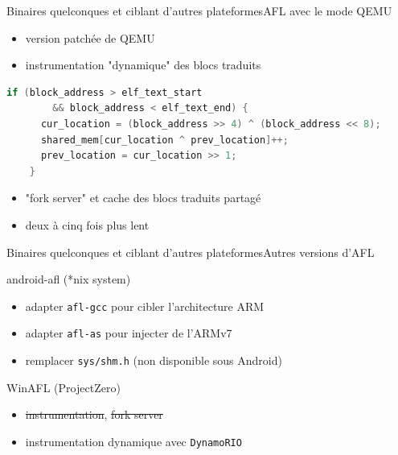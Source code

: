 \begin{frame}[fragile]{Binaires quelconques et ciblant d'autres plateformes}{AFL avec le mode QEMU}
  \begin{itemize}
  \item version patchée de QEMU
  \item instrumentation "dynamique" des blocs traduits
  \end{itemize}

  \begin{lstlisting}[language=C]
    if (block_address > elf_text_start
        && block_address < elf_text_end) {
      cur_location = (block_address >> 4) ^ (block_address << 8);
      shared_mem[cur_location ^ prev_location]++;
      prev_location = cur_location >> 1;
    }
  \end{lstlisting}

  \begin{itemize}
  \item "fork server" et cache des blocs traduits partagé
  \item deux à cinq fois plus lent
  \end{itemize}
\end{frame}

\begin{frame}{Binaires quelconques et ciblant d'autres plateformes}{Autres versions d'AFL}
  \begin{block}{android-afl (*nix system)}
    \begin{itemize}
    \item adapter \lstinline{afl-gcc} pour cibler l'architecture ARM
    \item adapter \lstinline{afl-as} pour injecter de l'ARMv7
    \item remplacer \lstinline{sys/shm.h} (non disponible sous Android)
    \end{itemize}
  \end{block}

  \begin{exampleblock}{WinAFL (ProjectZero)}
    \begin{itemize}
    \item \sout{instrumentation}, \sout{fork server}
    \item instrumentation dynamique avec \lstinline{DynamoRIO}
    \end{itemize}
  \end{exampleblock}
\end{frame}
